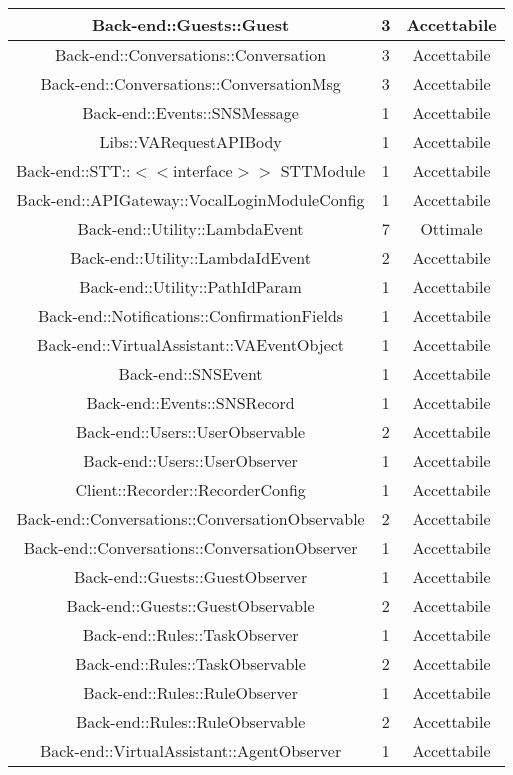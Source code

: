 \begin{longtable}{|c|c|c|}
\hline Back-end::Guests::Guest & 3 & Accettabile \\
\hline Back-end::Conversations::Conversation & 3 & Accettabile \\
\hline Back-end::Conversations::ConversationMsg & 3 & Accettabile \\
\hline Back-end::Events::SNSMessage & 1 & Accettabile \\
\hline Libs::VARequestAPIBody & 1 & Accettabile \\
\hline Back-end::STT::$<$$<$interface$>$$>$ STTModule & 1 & Accettabile \\
\hline Back-end::APIGateway::VocalLoginModuleConfig & 1 & Accettabile \\
\hline Back-end::Utility::LambdaEvent & 7 & Ottimale \\
\hline Back-end::Utility::LambdaIdEvent & 2 & Accettabile \\
\hline Back-end::Utility::PathIdParam & 1 & Accettabile \\
\hline Back-end::Notifications::ConfirmationFields & 1 & Accettabile \\
\hline Back-end::VirtualAssistant::VAEventObject & 1 & Accettabile \\
\hline Back-end::SNSEvent & 1 & Accettabile \\
\hline Back-end::Events::SNSRecord & 1 & Accettabile \\
\hline Back-end::Users::UserObservable & 2 & Accettabile \\
\hline Back-end::Users::UserObserver & 1 & Accettabile \\
\hline Client::Recorder::RecorderConfig & 1 & Accettabile \\
\hline Back-end::Conversations::ConversationObservable & 2 & Accettabile \\
\hline Back-end::Conversations::ConversationObserver & 1 & Accettabile \\
\hline Back-end::Guests::GuestObserver & 1 & Accettabile \\
\hline Back-end::Guests::GuestObservable & 2 & Accettabile \\
\hline Back-end::Rules::TaskObserver & 1 & Accettabile \\
\hline Back-end::Rules::TaskObservable & 2 & Accettabile \\
\hline Back-end::Rules::RuleObserver & 1 & Accettabile \\
\hline Back-end::Rules::RuleObservable & 2 & Accettabile \\
\hline Back-end::VirtualAssistant::AgentObserver & 1 & Accettabile \\

\end{longtable}
